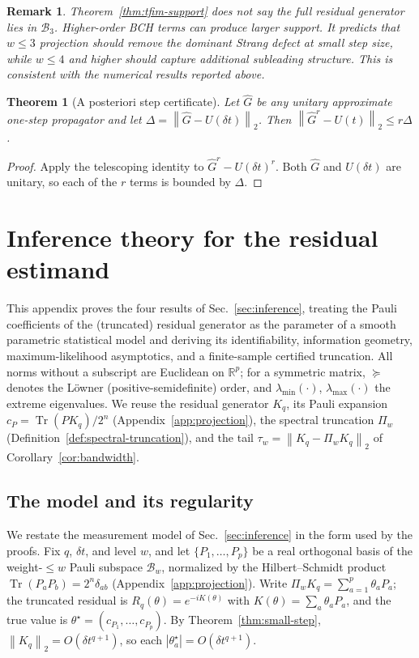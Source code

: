 \documentclass[aps,prresearch,reprint,superscriptaddress,nofootinbib,amsmath,amssymb]{revtex4-2}
\newcommand{\norm}[1]{\left\lVert #1 \right\rVert}
\newcommand{\abs}[1]{\left\lvert #1 \right\rvert}
\newcommand{\Tr}{\operatorname{Tr}}
\newcommand{\cB}{\mathcal{B}}
\newcommand{\dt}{\delta t}
\newtheorem{theorem}{Theorem}
\newtheorem{remark}{Remark}
\begin{document}
\begin{remark}
Theorem~\ref{thm:tfim-support} does not say the full residual generator lies in $\cB_3$. Higher-order BCH terms can produce larger support. It predicts that $w\leq3$ projection should remove the dominant Strang defect at small step size, while $w\leq4$ and higher should capture additional subleading structure. This is consistent with the numerical results reported above.
\end{remark}

\begin{theorem}[A posteriori step certificate]
\label{thm:posteriori}
Let $\widehat G$ be any unitary approximate one-step propagator and let $\Delta=\norm{\widehat G-U(\dt)}_2$. Then $\norm{\widehat G^r-U(t)}_2\leq r\Delta$.
\end{theorem}

\begin{proof}
Apply the telescoping identity to $\widehat G^r-U(\dt)^r$. Both $\widehat G$ and $U(\dt)$ are unitary, so each of the $r$ terms is bounded by $\Delta$.
\end{proof}

\section{Inference theory for the residual estimand}
\label{app:inference}

This appendix proves the four results of Sec.~\ref{sec:inference}, treating the Pauli coefficients of the (truncated) residual generator as the parameter of a smooth parametric statistical model and deriving its identifiability, information geometry, maximum-likelihood asymptotics, and a finite-sample certified truncation. All norms without a subscript are Euclidean on $\mathbb{R}^p$; for a symmetric matrix, $\succeq$ denotes the L\"owner (positive-semidefinite) order, and $\lambda_{\min}(\cdot)$, $\lambda_{\max}(\cdot)$ the extreme eigenvalues. We reuse the residual generator $K_q$, its Pauli expansion $c_P=\Tr(PK_q)/2^n$ (Appendix~\ref{app:projection}), the spectral truncation $\Pi_w$ (Definition~\ref{def:spectral-truncation}), and the tail $\tau_w=\norm{K_q-\Pi_wK_q}_2$ of Corollary~\ref{cor:bandwidth}.

\subsection{The model and its regularity}
\label{app:inference-model}

We restate the measurement model of Sec.~\ref{sec:inference} in the form used by the proofs. Fix $q$, $\dt$, and level $w$, and let $\{P_1,\dots,P_p\}$ be a real orthogonal basis of the weight-$\leq w$ Pauli subspace $\cB_w$, normalized by the Hilbert--Schmidt product $\Tr(P_aP_b)=2^n\delta_{ab}$ (Appendix~\ref{app:projection}). Write $\Pi_wK_q=\sum_{a=1}^{p}\theta_aP_a$; the truncated residual is $R_q(\theta)=e^{-iK(\theta)}$ with $K(\theta)=\sum_a\theta_aP_a$, and the true value is $\theta^\star=(c_{P_1},\dots,c_{P_p})$. By Theorem~\ref{thm:small-step}, $\norm{K_q}_2=O(\dt^{q+1})$, so each $\abs{\theta_a^\star}=O(\dt^{q+1})$.
\end{document}
